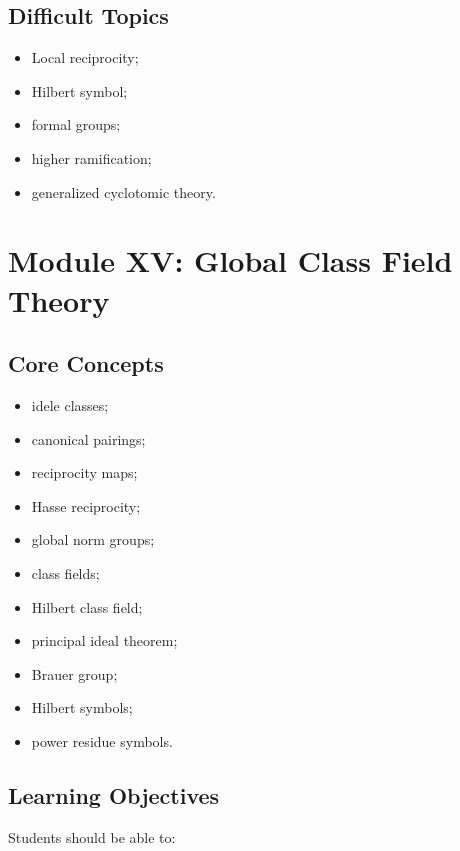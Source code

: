 \documentclass[11pt,a4paper]{article}
\begin{document}
\subsection{Difficult Topics}

\begin{itemize}
    \item Local reciprocity;
    \item Hilbert symbol;
    \item formal groups;
    \item higher ramification;
    \item generalized cyclotomic theory.
\end{itemize}

\section{Module XV: Global Class Field Theory}

\subsection{Core Concepts}

\begin{itemize}
    \item idele classes;
    \item canonical pairings;
    \item reciprocity maps;
    \item Hasse reciprocity;
    \item global norm groups;
    \item class fields;
    \item Hilbert class field;
    \item principal ideal theorem;
    \item Brauer group;
    \item Hilbert symbols;
    \item power residue symbols.
\end{itemize}

\subsection{Learning Objectives}

Students should be able to:
\end{document}
